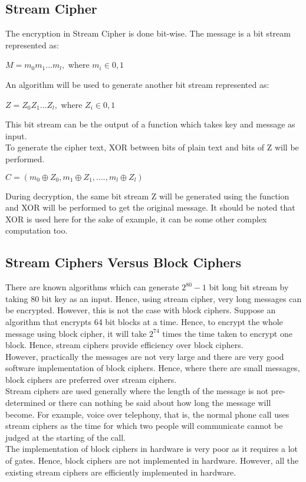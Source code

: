 \documentclass[11pt]{article}
\begin{document}
\subsection{Stream Cipher}
The encryption in Stream Cipher is done bit-wise. The message is a bit stream represented as:
\begin{center}
    $M = m_0m_1...m_l,$ where $ m_i \in {0, 1}$
\end{center}
An algorithm will be used to generate another bit stream represented as:
\begin{center}
    $Z = Z_0Z_1...Z_l,$ where $ Z_i \in {0, 1}$
\end{center}
This bit stream can be the output of a function which takes key and message as input.\\
To generate the cipher text, XOR between bits of plain text and bits of Z will be performed.
\begin{center}
    $C = (m_0 \oplus Z_0, m_1 \oplus Z_1,...., m_l \oplus Z_l)$
\end{center}
During decryption, the same bit stream Z will be generated using the function and XOR will be performed to get the original message. It should be noted that XOR is used here for the sake of example, it can be some other complex computation too.\\

\subsection{Stream Ciphers Versus Block Ciphers}
There are known algorithms which can generate $2^{80} - 1$ bit long bit stream by taking 80 bit key as an input. Hence, using stream cipher, very long messages can be encrypted. However, this is not the case with block ciphers. Suppose an algorithm that encrypts 64 bit blocks at a time. Hence, to encrypt the whole message using block cipher, it will take $2^{74}$ times the time taken to encrypt one block. Hence, stream ciphers provide efficiency over block ciphers. \\
\newline
However, practically the messages are not very large and there are very good software implementation of block ciphers. Hence, where there are small messages, block ciphers are preferred over stream ciphers.\\
\newline
Stream ciphers are used generally where the length of the message is not pre-determined or there can nothing be said about how long the message will become. For example, voice over telephony, that is, the normal phone call uses stream ciphers as the time for which two people will communicate cannot be judged at the starting of the call.\\
\newline
The implementation of block ciphers in hardware is very poor as it requires a lot of gates. Hence, block ciphers are not implemented in hardware. However, all the existing stream ciphers are efficiently implemented in hardware.
\end{document}
